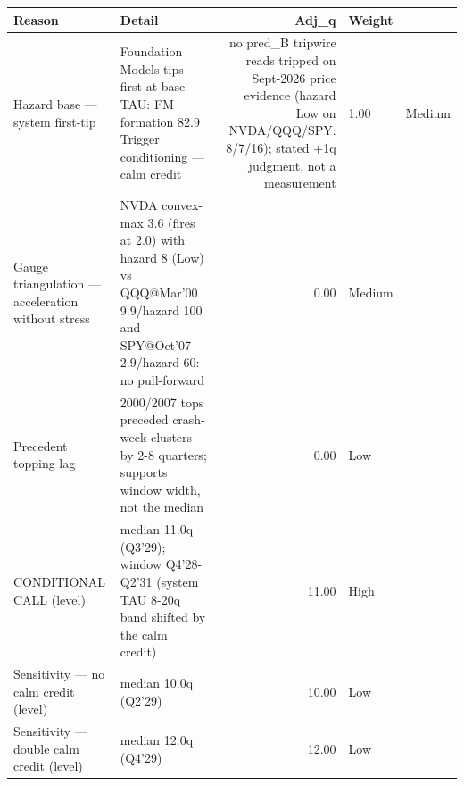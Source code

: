 \begin{tabular}{llrl}
\toprule
Reason & Detail & Adj_q & Weight \\
\midrule
Hazard base — system first-tip & Foundation Models tips first at base TAU: FM formation 82.9%
Trigger conditioning — calm credit & no pred_B tripwire reads tripped on Sept-2026 price evidence (hazard Low on NVDA/QQQ/SPY: 8/7/16); stated +1q judgment, not a measurement & 1.00 & Medium \\
Gauge triangulation — acceleration without stress & NVDA convex-max 3.6 (fires at 2.0) with hazard 8 (Low) vs QQQ@Mar'00 9.9/hazard 100 and SPY@Oct'07 2.9/hazard 60: no pull-forward & 0.00 & Medium \\
Precedent topping lag & 2000/2007 tops preceded crash-week clusters by 2-8 quarters; supports window width, not the median & 0.00 & Low \\
CONDITIONAL CALL (level) & median 11.0q (Q3'29); window Q4'28-Q2'31 (system TAU 8-20q band shifted by the calm credit) & 11.00 & High \\
Sensitivity — no calm credit (level) & median 10.0q (Q2'29) & 10.00 & Low \\
Sensitivity — double calm credit (level) & median 12.0q (Q4'29) & 12.00 & Low \\
\bottomrule
\end{tabular}
